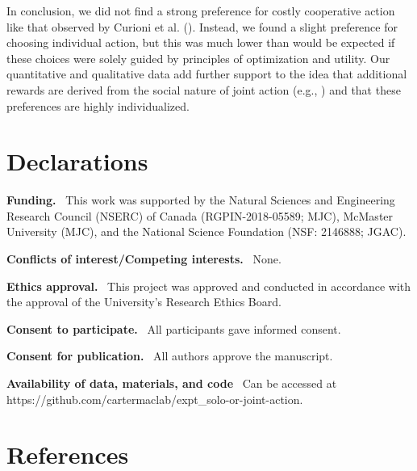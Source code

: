 \documentclass[
  man,
  floatsintext,
  longtable,
  nolmodern,
  notxfonts,
  notimes,
  mask,
  colorlinks=true,linkcolor=blue,citecolor=blue,urlcolor=blue]{apa7}
\begin{document}
In conclusion, we did not find a strong preference for costly
cooperative action like that observed by Curioni et al.
(). Instead, we found a slight
preference for choosing individual action, but this was much lower than
would be expected if these choices were solely guided by principles of
optimization and utility. Our quantitative and qualitative data add
further support to the idea that additional rewards are derived from the
social nature of joint action (e.g., ) and that these preferences are highly individualized.

\vfill

\section{Declarations}\label{declarations}

\noindent \textbf{Funding.} ~This work was supported by the Natural
Sciences and Engineering Research Council (NSERC) of Canada
(RGPIN-2018-05589; MJC), McMaster University (MJC), and the National
Science Foundation (NSF: 2146888; JGAC).

\noindent \textbf{Conflicts of interest/Competing interests.} ~None.

\noindent \textbf{Ethics approval.} ~This project was approved and
conducted in accordance with the approval of the University's Research
Ethics Board.

\noindent \textbf{Consent to participate.} ~All participants gave
informed consent.

\noindent \textbf{Consent for publication.} ~All authors approve the
manuscript.

\noindent \textbf{Availability of data, materials, and code} ~Can be
accessed at https://github.com/cartermaclab/expt\_solo-or-joint-action.

\newpage

\section{References}\label{references}
\end{document}
